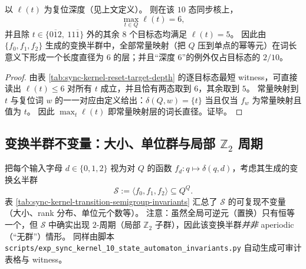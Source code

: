 

\begin{proposition}[复位深度谱的集中与常量映射理想的长度直径]\label{prop:sync10-reset-depth-diameter}
以 \(\ell(t)\) 为复位深度（见上文定义）。
则在该 \(10\) 态同步核上，
\[
\max_{t\in Q}\ell(t)=6,
\]
并且除 \(t\in\{0\overline{1}2,\ 11\overline{1}\}\) 外的其余 \(8\) 个目标态均满足 \(\ell(t)=5\)。
因此由 \(\{f_0,f_1,f_2\}\) 生成的变换半群中，全部常量映射（把 \(Q\) 压到单点的幂等元）在词长意义下形成一个长度直径为 \(6\) 的层；并且“深度 \(6\)”的例外仅占目标态的 \(2/10\)。
\end{proposition}
\begin{proof}
由表 \ref{tab:sync-kernel-reset-target-depth} 的逐目标态最短 witness，可直接读出 \(\ell(t)\le 6\) 对所有 \(t\) 成立，并且恰有两态取到 \(6\)，其余取到 \(5\)。
常量映射到 \(t\) 与复位词 \(w\) 的一一对应由定义给出：\(\delta(Q,w)=\{t\}\) 当且仅当 \(f_w\) 为常量映射且值为 \(t\)。
因此 \(\max_t\ell(t)\) 即常量映射层的词长直径。证毕。
\end{proof}

\subsection{变换半群不变量：大小、单位群与局部 \texorpdfstring{$\mathbb{Z}_2$}{Z2} 周期}\label{app:sync-kernel-semigroup}
把每个输入字母 $d\in\{0,1,2\}$ 视为对 $Q$ 的函数 $f_d:q\mapsto\delta(q,d)$，考虑其生成的变换幺半群
\[
\mathcal{S}:=\langle f_0,f_1,f_2\rangle\subseteq Q^Q.
\]
表 \ref{tab:sync-kernel-transition-semigroup-invariants} 汇总了 $\mathcal{S}$ 的可复现不变量（大小、rank 分布、单位元个数等）。
注意：虽然全局可逆元（置换）只有恒等一个，但 $\mathcal{S}$ 中确实出现 $2$-周期（局部 $\mathbb{Z}_2$ 子群），因此该变换半群\emph{并非} aperiodic（“无群”）情形。
同样由脚本 \texttt{scripts/exp\_sync\_kernel\_10\_state\_automaton\_invariants.py} 自动生成可审计表格与 witness。



